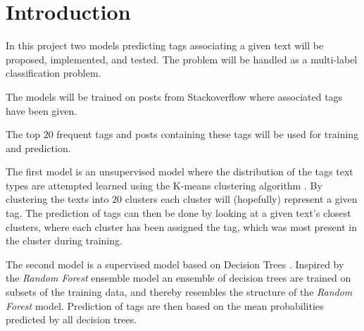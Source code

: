 
\section{Introduction}

In this project two models predicting tags associating a given text will be
proposed, implemented, and tested. The problem will be handled as a
multi-label classification problem.

The models will be trained on posts from Stackoverflow where associated
tags have been given.

The top $20$ frequent tags and posts containing these tags will be used for
training and prediction.


The first model is an unsupervised model where the distribution of the tags
text types are attempted learned using the K-means clustering algorithm
\cite{numerical-optimization}. By clustering the texts into $20$ clusters each
cluster will (hopefully) represent a given tag. The prediction of tags can
then be done by looking at a given text's closest clusters, where each cluster
has been assigned the tag, which was most present in the cluster during training.


The second model is a supervised model based on Decision Trees
\cite{numerical-optimization}. Inspired by the \textit{Random Forest} ensemble
model an ensemble of decision trees are trained on subsets of the training data,
and thereby resembles the structure of the \textit{Random Forest} model.
Prediction of tags are then based on the mean probabilities predicted by all
decision trees.
